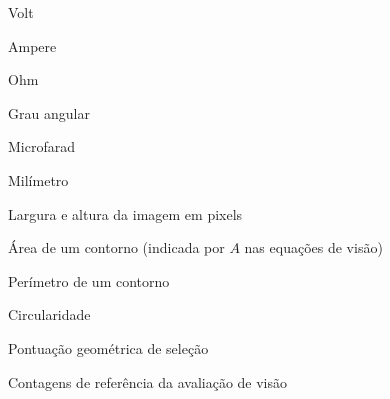\begin{simbolos}
\item[$V$] Volt
\item[$A$] Ampere
\item[$\Omega$] Ohm
\item[$^{\circ}$] Grau angular
\item[$\mu$F] Microfarad
\item[mm] Milímetro
\item[$W,H$] Largura e altura da imagem em pixels
\item[$A_{\mathrm{contorno}}$] Área de um contorno (indicada por $A$ nas equações de visão)
\item[$L$] Perímetro de um contorno
\item[$C$] Circularidade
\item[$S$] Pontuação geométrica de seleção
\item[$VP,VN,FP,FN$] Contagens de referência da avaliação de visão
\end{simbolos}
